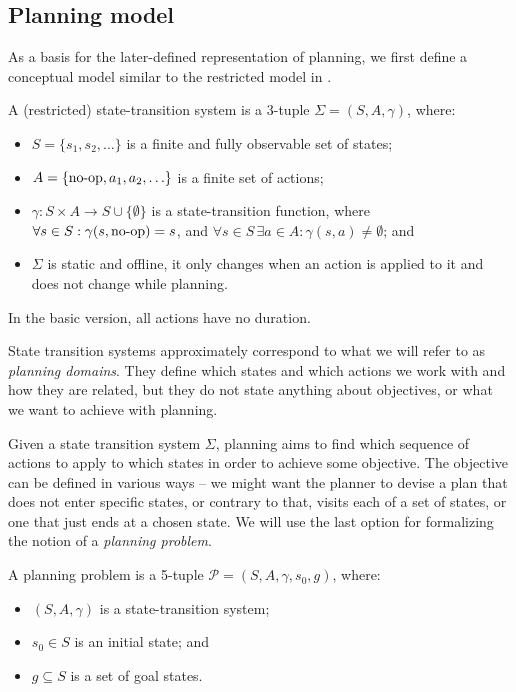 \subsection{Planning model}

As a basis for the later-defined representation of planning, we first define
a conceptual model similar to the restricted model in \citep[Section~1.4, Section~1.5]{Ghallab2004}.

\begin{defn}\label{defn:state-transition-sys}
A (restricted) state-transition system is a 3-tuple $\Sigma = (S, A, \gamma)$, where:
\begin{itemize}
\item $S = \{s_1, s_2, \ldots\}$ is a finite and fully observable set of states;
\item $A = \{\operatorname{\textrm{no-op}}, a_1, a_2, \ldots\}$ is a finite set of actions;
\item $\gamma: S \times A \to S \cup \{\emptyset\}$ is a state-transition function,
where $\forall s \in S : \gamma(s, \operatorname{\textrm{no-op}}) = s$,
and $\forall s \in S\,\exists a \in A : \gamma(s, a) \neq \emptyset$; and
\item $\Sigma$ is static and offline,
it only changes when an action is applied to it and does not change while planning.
\end{itemize}
In the basic version, all actions have no duration.
\end{defn}

State transition systems approximately correspond to what we will refer to as \textit{planning domains}.
They define which states and which actions we work with and how they
are related, but they do not state anything about objectives, or what
we want to achieve with planning.

Given a state transition system $\Sigma$, planning aims to find which
sequence of actions to apply to which states in order to achieve some objective.
The objective can be defined in various ways -- we might want the planner
to devise a plan that
does not enter specific states, or contrary to that, visits each of a set of states,
or one that just ends at a chosen state.
We will use the last option for formalizing the notion of a \textit{planning problem}.

\begin{defn}\label{defn:planning-problem}\citep[Part~I]{Ghallab2004}
A planning problem is a 5-tuple $\mathcal{P} = (S, A, \gamma, s_0, g)$, where:
\begin{itemize}
\item $(S, A, \gamma)$ is a state-transition system;
\item $s_0 \in S$ is an initial state; and
\item $g \subseteq S$ is a set of goal states.
\end{itemize}
\end{defn}

